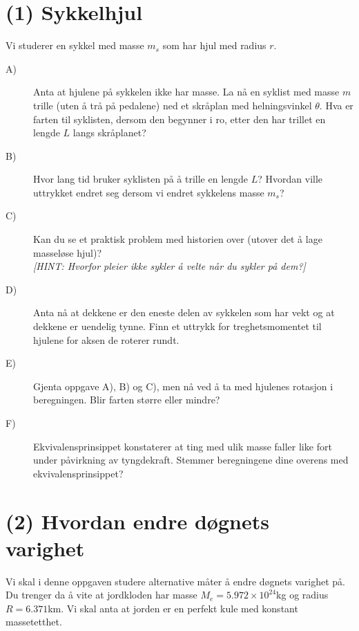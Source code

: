 \documentclass[twoside,utf8]{article}
\begin{document}
\section*{(1) Sykkelhjul}
Vi studerer en sykkel med masse $m_s$ som har hjul med radius $r$.
\begin{description}
  \item[A)] Anta at hjulene på sykkelen ikke har masse. La nå en syklist med masse $m$ trille (uten å trå på pedalene) ned et skråplan med helningsvinkel $\theta$. Hva er farten til syklisten, dersom den begynner i ro, etter den har trillet en lengde $L$ langs skråplanet?

  \item[B)] Hvor lang tid bruker syklisten på å trille en lengde $L$? Hvordan ville uttrykket endret seg dersom vi endret sykkelens masse $m_s$?

  \item[C)] Kan du se et praktisk problem med historien over (utover det å lage masseløse hjul)? \\
  {\it[HINT: Hvorfor pleier ikke sykler å velte når du sykler på dem?]}

  \item[D)] Anta nå at dekkene er den eneste delen av sykkelen som har vekt og  at dekkene er uendelig tynne. Finn et uttrykk for treghetsmomentet til hjulene for aksen de roterer rundt.

  \item[E)] Gjenta oppgave A), B) og C), men nå ved å ta med hjulenes rotasjon i beregningen. Blir farten større eller mindre?

  \item[F)] Ekvivalensprinsippet konstaterer at ting med ulik masse faller like fort under påvirkning av tyngdekraft. Stemmer beregningene dine overens med ekvivalensprinsippet?
\end{description}



\section*{(2) Hvordan endre døgnets varighet}
Vi skal i denne oppgaven studere alternative måter å endre døgnets varighet på. Du trenger da å vite at jordkloden har masse $M_e = 5.972 \times 10^{24}$kg og radius $R=6.371$km. Vi skal anta at jorden er en perfekt kule med konstant massetetthet.
\end{document}
